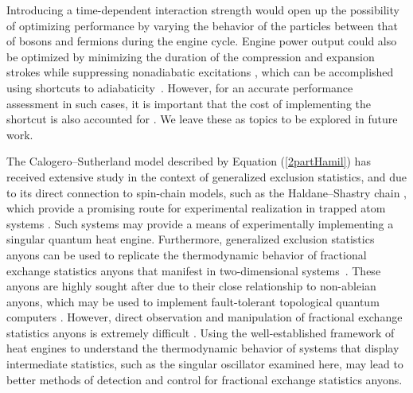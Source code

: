 \documentclass[preprints,article,accept,moreauthors,pdftex]{Definitions/mdpi}
\begin{document}
\begin{paracol}{2}
Introducing a time-dependent interaction strength would open up the possibility of optimizing performance by varying the behavior of the particles between that of bosons and fermions during the engine cycle. {Engine power output could also be optimized by minimizing the duration of the compression and expansion strokes while suppressing nonadiabatic excitations \cite{Stefanatos2017}, which can be accomplished using shortcuts to \mbox{adiabaticity~\cite{Torrontegui2013, GueryOdelin2019}}. However, for an accurate performance assessment in such cases, it is important that the cost of implementing the shortcut is also accounted for \cite{Campbell2017, Abah2017, Abah2018, Baris2019, Abah2019, Torrontegui2017, Tobalina2019}.} We leave these as topics to be explored in future work.    
	
The Calogero--Sutherland model described by Equation (\ref{2partHamil}) has received extensive study in the context of generalized exclusion statistics, and due to its direct connection to spin-chain models, such as the Haldane--Shastry chain \cite{Haldane1988, Shastry1988, Polychronakos1993, Haldane1994}, which provide a promising route for experimental realization in trapped atom systems \cite{Grass2014, Britton2012, Bohnet2016, Labuhn2016}. Such systems may provide a means of experimentally implementing a singular quantum heat engine. Furthermore, generalized exclusion statistics anyons can be used to replicate the thermodynamic behavior of fractional exchange statistics anyons that manifest in two-dimensional systems~\cite{Myers2021}. These anyons are highly sought after due to their close relationship to non-ableian anyons, which may be used to implement fault-tolerant topological quantum computers \cite{Moore1991}. {However, direct observation and manipulation of fractional exchange statistics anyons is extremely difficult \cite{Bartolomei2020}.} Using the well-established framework of heat engines to understand the thermodynamic behavior of systems that display intermediate statistics, {such as the singular oscillator examined here,} may lead to better methods of detection and control for fractional exchange statistics anyons.    
 
\vspace{6pt} 



\end{paracol}
\end{document}
